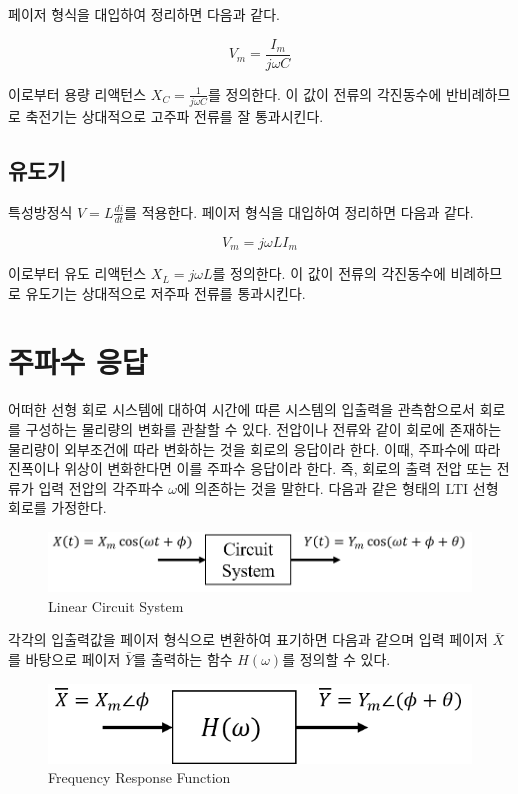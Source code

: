 \documentclass{article}
\begin{document}
페이저 형식을 대입하여 정리하면 다음과 같다.

\begin{equation}
    V_m=\frac{I_m}{j\omega C}
\end{equation}

이로부터 용량 리액턴스 $X_C=\frac{1}{j\omega C}$를 정의한다. 이 값이 전류의 각진동수에 반비례하므로 축전기는 상대적으로 고주파 전류를 잘 통과시킨다.


\subsection{유도기}
특성방정식 $V=L\frac{di}{dt}$를 적용한다. 페이저 형식을 대입하여 정리하면 다음과 같다.

\begin{equation}
    V_m=j\omega LI_m
\end{equation}

이로부터 유도 리액턴스 $X_L=j\omega L$를 정의한다. 이 값이 전류의 각진동수에 비례하므로 유도기는 상대적으로 저주파 전류를 통과시킨다.


\section{주파수 응답}
어떠한 선형 회로 시스템에 대하여 시간에 따른 시스템의 입출력을 관측함으로서 회로를 구성하는 물리량의 변화를 관찰할 수 있다. 전압이나 전류와 같이 회로에 존재하는 물리량이 외부조건에 따라 변화하는 것을 회로의 응답이라 한다. 이때, 주파수에 따라 진폭이나 위상이 변화한다면 이를 주파수 응답이라 한다. 즉, 회로의 출력 전압 또는 전류가 입력 전압의 각주파수 $\omega$에 의존하는 것을 말한다. 다음과 같은 형태의 LTI 선형 회로를 가정한다.

\begin{figure}[h]
    \centering
    \includegraphics[scale=0.6]{./Linear Circuit System.png}
    \caption{Linear Circuit System}
\end{figure}

각각의 입출력값을 페이저 형식으로 변환하여 표기하면 다음과 같으며 입력 페이저 $\bar{X}$를 바탕으로 페이저 $\bar{Y}$를 출력하는 함수 $H(\omega)$를 정의할 수 있다.

\begin{figure}[h]
    \centering
    \includegraphics[scale=0.6]{./Frequency Response Function.png}
    \caption{Frequency Response Function}
\end{figure}
\end{document}
